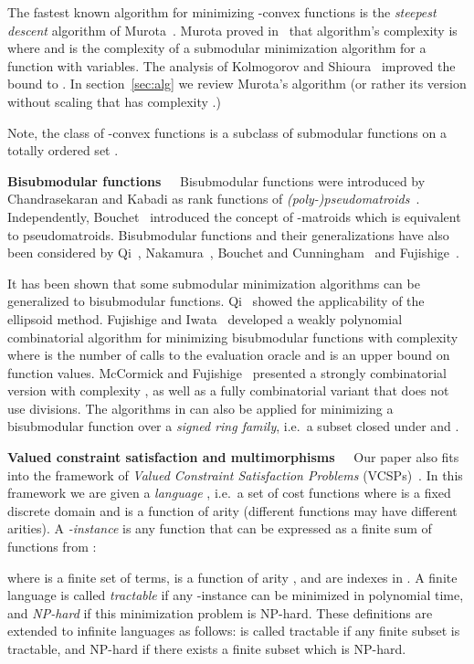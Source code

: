 \documentclass[11pt,onecolumn]{article}
\newcommand{\myparagraph}[1]{{\vspace*{2pt}\noindent\bf{#1}~~}}
\begin{document}
The fastest known algorithm for minimizing -convex functions is the {\em steepest descent} algorithm
of Murota~\cite{Murota:IEICE00,Murota:book,Murota:SIAM03}. 
Murota proved in~\cite{Murota:SIAM03} that algorithm's complexity is 
where  and  is the complexity of a submodular minimization algorithm for a function with  variables.
The analysis of Kolmogorov and Shioura~\cite{KS:09} improved the bound to .
In section~\ref{sec:alg} we review Murota's algorithm (or rather its version without scaling that has complexity .)

Note, the class of -convex functions is a subclass of submodular functions on a totally ordered set .

\myparagraph{Bisubmodular functions}
Bisubmodular functions were introduced by Chandrasekaran and Kabadi
as rank functions of {\em (poly-)pseudomatroids}~\cite{Chandrasekaran:88,Kabadi:90}.
Independently, Bouchet~\cite{Bouchet:87} introduced the concept of -matroids which is equivalent
to pseudomatroids.
Bisubmodular functions and their generalizations have also been considered by Qi~\cite{Qi:88},
Nakamura~\cite{Nakamura:88}, Bouchet and Cunningham~\cite{Bouchet:95} and Fujishige~\cite{Fujishige:91}.

It has been shown that some submodular minimization algorithms can be generalized to bisubmodular functions.
Qi~\cite{Qi:88} showed the applicability of the ellipsoid method.
Fujishige and Iwata~\cite{Fujishige:06} developed a weakly polynomial combinatorial algorithm for minimizing bisubmodular functions with
complexity  where  is the number of calls to the evaluation oracle and  is an upper bound on function values.
McCormick and Fujishige~\cite{McCormick:10} presented a strongly combinatorial version with
complexity , as well as a  fully combinatorial variant that does not use divisions.
The algorithms in \cite{McCormick:10} can also be applied for minimizing a bisubmodular
function over a {\em signed ring family}, i.e.\ a subset  closed under  and .

\myparagraph{Valued constraint satisfaction and multimorphisms}
Our paper also fits into the framework of {\em Valued Constraint Satisfaction Problems} (VCSPs)~\cite{Cohen:AI06}.
In this framework we are given a {\em language} , i.e.\ a set of cost functions 
where  is a fixed discrete domain and  is a function of arity  (different functions  may have different arities).
A {\em -instance} is any function  that can be expressed as a finite sum of functions from :

where  is a finite set of terms,  is a function of arity , and  are indexes in .
A finite language  is called {\em tractable} if any -instance can be minimized in polynomial time,
and {\em NP-hard} if this minimization problem is NP-hard. These definitions are extended to infinite languages  
as follows:  is called tractable if any finite subset  is tractable,
and NP-hard if there exists a finite subset  which is NP-hard.
\end{document}
